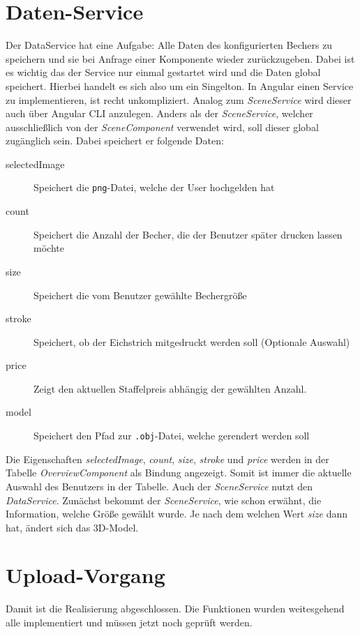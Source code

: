 \section{Daten-Service}
\label{sec:umsetzung}
%
Der DataService hat eine Aufgabe: Alle Daten des konfigurierten Bechers zu speichern und sie bei Anfrage einer Komponente wieder zurückzugeben. Dabei ist es wichtig das der Service nur einmal gestartet wird und die Daten global speichert. Hierbei handelt es sich also um ein Singelton. In Angular einen Service zu implementieren, ist recht unkompliziert. Analog zum \textit{SceneService} wird dieser auch über Angular CLI anzulegen. Anders als der \textit{SceneService}, welcher ausschließlich von der \textit{SceneComponent} verwendet wird, soll dieser global zugänglich sein. Dabei speichert er folgende Daten:
\begin{description}
	\item[selectedImage] Speichert die \texttt{png}-Datei, welche der User hochgelden hat
	\item[count] Speichert die Anzahl der Becher, die der Benutzer später drucken lassen möchte 
	\item[size] Speichert die vom Benutzer gewählte Bechergröße
	\item[stroke] Speichert, ob der Eichstrich mitgedruckt werden soll (Optionale Auswahl)
	\item[price] Zeigt den aktuellen Staffelpreis abhängig der gewählten Anzahl.
	\item[model] Speichert den Pfad zur \texttt{.obj}-Datei, welche gerendert werden soll
\end{description}
%
Die Eigenschaften \textit{selectedImage}, \textit{count}, \textit{size}, \textit{stroke} und \textit{price} werden in der Tabelle \textit{OverviewComponent} als Bindung angezeigt. Somit ist immer die aktuelle Auswahl des Benutzers in der Tabelle. Auch der \textit{SceneService} nutzt den \textit{DataService}. Zunächst bekommt der \textit{SceneService}, wie schon erwähnt, die Information, welche Größe gewählt wurde. Je nach dem welchen Wert \textit{size} dann hat, ändert sich das 3D-Model.
%
\section{Upload-Vorgang}
\label{sec:umsetzung}
%
Damit ist die Realisierung abgeschlossen. Die Funktionen wurden weitesgehend alle implementiert und müssen jetzt noch geprüft werden.